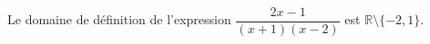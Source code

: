 Le domaine de définition de l'expression $\dfrac{2x-1}{(x+1)(x-2)}$ est $\mathbb R \setminus \{-2,1\}$.

\begin{reponses}
\end{reponses}

